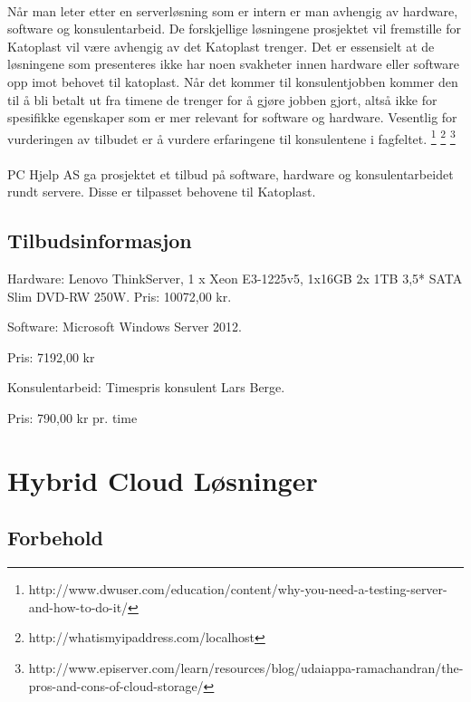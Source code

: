 \paragraph{} Når man leter etter en serverløsning som er intern er man avhengig av hardware, software og konsulentarbeid. De forskjellige løsningene prosjektet vil fremstille for Katoplast vil være avhengig av det Katoplast trenger.  Det er essensielt at de løsningene som presenteres ikke har noen svakheter innen hardware eller software opp imot behovet til katoplast. Når det kommer til konsulentjobben kommer den til å bli betalt ut fra timene de trenger for å gjøre jobben gjort, altså ikke for spesifikke egenskaper som er mer relevant for software og hardware. Vesentlig for vurderingen av tilbudet er å vurdere erfaringene til konsulentene i fagfeltet. 
\footnote{http://www.dwuser.com/education/content/why-you-need-a-testing-server-and-how-to-do-it/}
\footnote{http://whatismyipaddress.com/localhost}
\footnote{http://www.episerver.com/learn/resources/blog/udaiappa-ramachandran/the-pros-and-cons-of-cloud-storage/}

\paragraph{} PC Hjelp AS ga prosjektet et tilbud på software, hardware og konsulentarbeidet rundt servere. Disse er tilpasset behovene til Katoplast.
\subsection{Tilbudsinformasjon}
\begin{description}
\item Hardware: Lenovo ThinkServer, 1 x Xeon E3-1225v5, 1x16GB 2x 1TB 3,5* SATA Slim DVD-RW 250W. Pris: 10072,00 kr.
\item Software: Microsoft Windows Server 2012. 
\item Pris: 7192,00 kr
\item Konsulentarbeid: Timespris konsulent Lars Berge. 
\item Pris: 790,00 kr pr. time
\end{description}
  
 
\section{Hybrid Cloud Løsninger}
\subsection{Forbehold}
